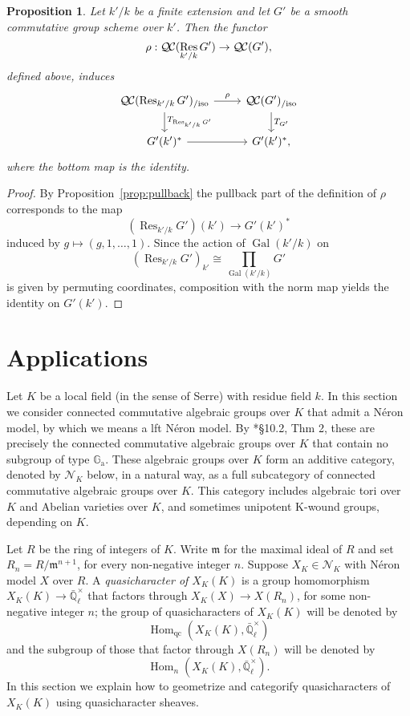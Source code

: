 \documentclass{amsart}
\theoremstyle{plain}
\newtheorem{proposition}[theorem]{Proposition}
\theoremstyle{definition}
\theoremstyle{remark}
\newcommand{\EE}{\mathbb{\bar Q}_\ell}
\newcommand{\Fq}{k}
\newcommand{\EEx}{\EE^\times}
\newcommand{\m}{{\mathfrak{m}}}
\DeclareMathOperator{\Gal}{Gal}
\DeclareMathOperator{\Hom}{Hom}
\DeclareMathOperator{\Res}{Res}
\newcommand{\TrFrob}[1]{T_{#1}}
\newcommand{\QC}{{\mathcal{Q\hskip-0.8pt C}}}
\newcommand{\QCiso}[1]{\QC(#1)_{/\text{iso}}}
\begin{document}
\begin{proposition}
Let $k'/k$ be a finite extension and let $G'$ be a smooth commutative group scheme over $k'$.
Then the functor 
\[
\rho : \QC(\Res_{k'/k}G') \to \QC(G'),
\]
defined above, induces
\[
\begin{tikzcd}
\QCiso{\Res_{k'/k} G'} \dar{\TrFrob{\Res_{k'/k} G'}} \rar{\rho} & \QCiso{G'} \dar{\TrFrob{G'}}\\
G'(k')^* \rar & G'(k')^*,
\end{tikzcd}
\]
where the bottom map is the identity.
\end{proposition}
\begin{proof}
By Proposition~\ref{prop:pullback} the pullback part of the definition of $\rho$ corresponds to the map
\[
(\Res_{k'/k}G')(k') \to G'(k')^*
\]
induced by $g \mapsto (g, 1, \ldots, 1)$.  Since the action of $\Gal(k'/k)$ on
\[
(\Res_{k'/k}G')_{k'} \cong \prod_{\Gal(k'/k)} G'
\]
is given by permuting coordinates, composition with the norm map yields the identity on $G'(k')$.
\end{proof}



\section{Applications}\label{sec:applications}%

Let $K$ be a local field (in the sense of Serre) with residue field $\Fq$. 
In this section we consider connected commutative algebraic groups over $K$ that admit a Néron model, by which we means a lft Néron model.
By \cite{bosch-lutkebohmert-reynaud:NeronModels}*{\S 10.2, Thm 2}, these are precisely the connected commutative algebraic groups over $K$ that contain no subgroup of type $\mathbb{G}_\text{a}$.
These algebraic groups over $K$ form an additive category, denoted by $\mathcal{N}_K$ below, in a natural way, as a full subcategory of connected commutative algebraic groups over $K$. This category includes algebraic tori over $K$ and Abelian varieties over $K$, and sometimes unipotent K-wound groups, depending on $K$.

Let $R$ be the ring of integers of $K$.
Write $\m$ for the maximal ideal of $R$ and set $R_n = R/\m^{n+1}$, for every non-negative integer $n$.
Suppose $X_K \in \mathcal{N}_K$ with Néron model $X$ over $R$.
A {\it quasicharacter of $X_K(K)$} is a group homomorphism $X_K(K) \to \EEx$ that factors through $X_K(X) \to X(R_n)$, for some non-negative integer $n$;
the group of quasicharacters of $X_K(K)$ will be denoted by 
\[
\Hom_\text{qc}(X_K(K),\EEx)
\]
 and the subgroup of those that factor through $X(R_n)$ will be denoted by 
 \[
 \Hom_n(X_K(K),\EEx).
\]
In this section we explain how to geometrize and categorify quasicharacters of $X_K(K)$ using quasicharacter sheaves.
\end{document}
